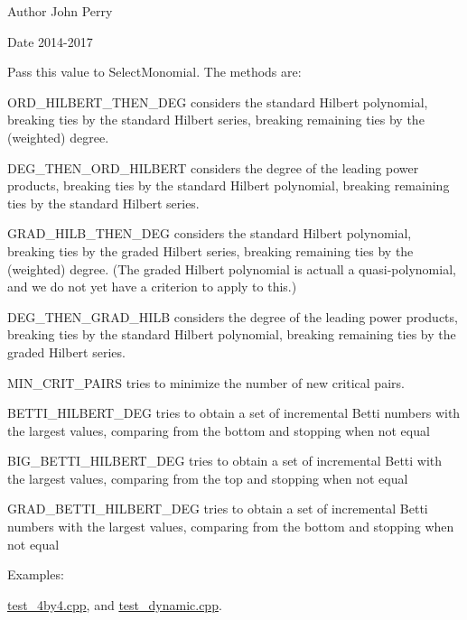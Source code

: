 \begin{DoxyAuthor}{Author}
John Perry 
\end{DoxyAuthor}
\begin{DoxyDate}{Date}
2014-\/2017
\end{DoxyDate}
Pass this value to Select\+Monomial. The methods are\+:
\begin{DoxyEnumerate}
\item {\ttfamily O\+R\+D\+\_\+\+H\+I\+L\+B\+E\+R\+T\+\_\+\+T\+H\+E\+N\+\_\+\+D\+EG} considers the standard Hilbert polynomial, breaking ties by the standard Hilbert series, breaking remaining ties by the (weighted) degree.
\item {\ttfamily D\+E\+G\+\_\+\+T\+H\+E\+N\+\_\+\+O\+R\+D\+\_\+\+H\+I\+L\+B\+E\+RT} considers the degree of the leading power products, breaking ties by the standard Hilbert polynomial, breaking remaining ties by the standard Hilbert series.
\item {\ttfamily G\+R\+A\+D\+\_\+\+H\+I\+L\+B\+\_\+\+T\+H\+E\+N\+\_\+\+D\+EG} considers the standard Hilbert polynomial, breaking ties by the graded Hilbert series, breaking remaining ties by the (weighted) degree. (The graded Hilbert polynomial is actuall a quasi-\/polynomial, and we do not yet have a criterion to apply to this.)
\item {\ttfamily D\+E\+G\+\_\+\+T\+H\+E\+N\+\_\+\+G\+R\+A\+D\+\_\+\+H\+I\+LB} considers the degree of the leading power products, breaking ties by the standard Hilbert polynomial, breaking remaining ties by the graded Hilbert series.
\item {\ttfamily M\+I\+N\+\_\+\+C\+R\+I\+T\+\_\+\+P\+A\+I\+RS} tries to minimize the number of new critical pairs.
\item {\ttfamily B\+E\+T\+T\+I\+\_\+\+H\+I\+L\+B\+E\+R\+T\+\_\+\+D\+EG} tries to obtain a set of incremental Betti numbers with the largest values, comparing from the bottom and stopping when not equal
\item {\ttfamily B\+I\+G\+\_\+\+B\+E\+T\+T\+I\+\_\+\+H\+I\+L\+B\+E\+R\+T\+\_\+\+D\+EG} tries to obtain a set of incremental Betti with the largest values, comparing from the top and stopping when not equal
\item {\ttfamily G\+R\+A\+D\+\_\+\+B\+E\+T\+T\+I\+\_\+\+H\+I\+L\+B\+E\+R\+T\+\_\+\+D\+EG} tries to obtain a set of incremental Betti numbers with the largest values, comparing from the bottom and stopping when not equal 
\end{DoxyEnumerate}\begin{Desc}
\item[Examples\+: ]\par
\hyperlink{test_4by4_8cpp-example}{test\+\_\+4by4.\+cpp}, and \hyperlink{test_dynamic_8cpp-example}{test\+\_\+dynamic.\+cpp}.\end{Desc}


